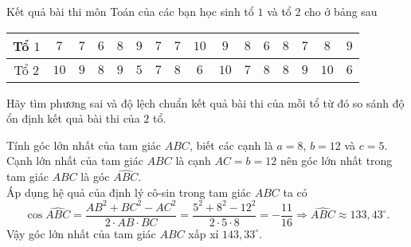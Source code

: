 \begin{bt}%
Kết quả bài thi môn Toán của các bạn học sinh tổ $1$ và tổ $2$ cho ở bảng sau
\begin{longtable}{|c|c|c|c|c|c|c|c|c|c|c|c|c|c|c|c|}
\hline Tổ $1$ & $7$ & $7$ & $6$ & $8$ & $9$ & $7$ & $7$ & $10$ & $9$ & $8$ & $6$ & $8$ & $7$ & $8$ & $9$\\
\hline Tổ $2$ & $10$ & $9$ & $8$ & $9$ & $5$ & $7$ & $8$ & $6$ & $10$ & $7$ & $8$ & $8$ & $9$ & $10$ & $6$\\
\hline
\end{longtable}
\noindent
Hãy tìm phương sai và độ lệch chuẩn kết quả bài thi của mỗi tổ từ đó so sánh độ ổn định kết quả bài thi của $2$ tổ.
\end{bt}

\begin{bt}%
Tính góc lớn nhất của tam giác $ABC$, biết các cạnh là $a=8$, $b=12$ và $c=5$.
\loigiai
{Cạnh lớn nhất của tam giác $ABC$ là cạnh $AC=b=12$ nên góc lớn nhất trong tam giác $ABC$ là góc $\widehat{ABC}$.\\
Áp dụng hệ quả của định lý cô-sin trong tam giác $ABC$ ta có
\[\cos\widehat{ABC}=\dfrac{AB^2+BC^2-AC^2}{2\cdot AB\cdot BC}=\dfrac{5^2+8^2-12^2}{2\cdot5\cdot8}=-\dfrac{11}{16}\Rightarrow\widehat{ABC}\approx133{,}43^{\circ}.\]
Vậy góc lớn nhất của tam giác $ ABC $ xấp xỉ $143{,}33^{\circ}$.
}
\end{bt}

